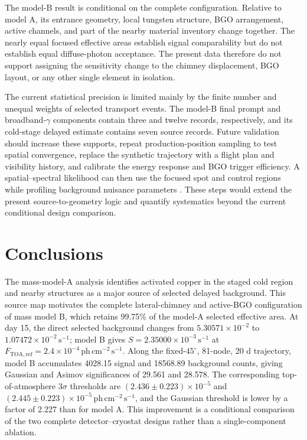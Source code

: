\documentclass[11pt]{article}
\newcommand{\phcms}{\ensuremath{\,\mathrm{ph\,cm^{-2}\,s^{-1}}}}
\newcommand{\cps}{\ensuremath{\,\mathrm{s^{-1}}}}
\newcommand{\ftoaref}{F_{\mathrm{TOA,ref}}}
\begin{document}
The model-B result is conditional on the complete configuration. Relative to
model A, its entrance geometry, local tungsten structure, BGO arrangement,
active channels, and part of the nearby material inventory change together.
The nearly equal focused effective areas establish signal comparability but do
not establish equal diffuse-photon acceptance. The present data therefore do
not support assigning the sensitivity change to the chimney displacement, BGO
layout, or any other single element in isolation.

The current statistical precision is limited mainly by the finite number and
unequal weights of selected transport events. The model-B final prompt and
broadband-$\gamma$ components contain three and twelve records, respectively,
and its cold-stage delayed estimate contains seven source records. Future
validation should increase these supports, repeat production-position sampling
to test spatial convergence, replace the synthetic trajectory with a flight
plan and visibility history, and calibrate the energy response and BGO trigger
efficiency. A spatial--spectral likelihood can then use the focused spot and
control regions while profiling background nuisance parameters
\cite{Cowan2011}. These steps would extend the present source-to-geometry logic
and quantify systematics beyond the current conditional design comparison.

\section{Conclusions}
\label{sec:conclusions}

The mass-model-A analysis identifies activated copper in the staged cold region
and nearby structures as a major source of selected delayed background. This
source map motivates the complete lateral-chimney and active-BGO configuration
of mass model B, which retains 99.75\% of the model-A selected effective area.
At day 15, the direct selected background changes from
$5.30571\times10^{-2}$ to $1.07472\times10^{-2}\cps$; model B gives
$S=2.35000\times10^{-3}\cps$ at $\ftoaref=2.4\times10^{-4}\phcms$. Along the
fixed-$45^\circ$, 81-node, 20 d trajectory, model B accumulates 4028.15 signal
and 18568.89 background counts, giving Gaussian and Asimov significances of
29.561 and 28.578. The corresponding top-of-atmosphere $3\sigma$ thresholds are
$(2.436\pm0.223)\times10^{-5}$ and
$(2.445\pm0.223)\times10^{-5}\phcms$, and the Gaussian threshold is lower by a
factor of 2.227 than for model A. This improvement is a conditional comparison
of the two complete detector--cryostat designs rather than a single-component
ablation.
\end{document}
